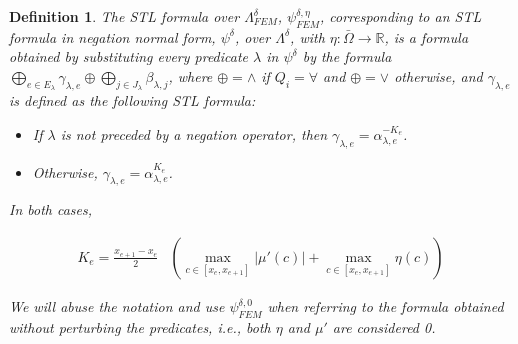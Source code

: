 \documentclass{article}
\newtheorem{definition}{Definition}
\newcommand*{\R}{\mathbb{R}}
\begin{document}
\begin{definition} 
\label{def:eta_approximation}
    The STL formula over $\Lambda^{\delta}_{FEM}$, $\psi^{\delta, \eta}_{FEM}$, corresponding to an STL
    formula in negation normal form, $\psi^\delta$, over $\Lambda^\delta$, with
    $\eta : \bar\Omega \to \R$, is a formula obtained by substituting every
    predicate $\lambda$ in $\psi^\delta$ by the formula $\bigoplus_{e \in
    E_\lambda} \gamma_{\lambda,e} \oplus \bigoplus_{j \in J_\lambda} \beta_{\lambda, j}$, 
    where $\oplus = \wedge$ if $Q_i = \forall$ and $\oplus = \vee$
    otherwise, and $\gamma_{\lambda,e}$ is defined as the following STL formula:

    \begin{itemize}
        \item If $\lambda$ is not preceded by a negation operator, then
            $\gamma_{\lambda, e} = \alpha_{\lambda, e}^{-K_e}$.
        \item Otherwise, $\gamma_{\lambda, e} = \alpha_{\lambda, e}^{K_e}$.
    \end{itemize}

    In both cases, 

    \begin{equation}
    \begin{aligned}
        K_e = \frac{x_{e+1} - x_e}{2} & \left (\max_{c \in [x_e, x_{e+1}]}
        |\mu'(c)| + \max_{c \in [x_e, x_{e+1}]} \eta(c) \right )
    \end{aligned}
    \end{equation}

    We will abuse the notation and use $\psi^{\delta, 0}_{FEM}$ when referring
    to the formula obtained without perturbing the predicates, i.e., both $\eta$
    and $\mu'$ are considered 0.
\end{definition}
\end{document}
